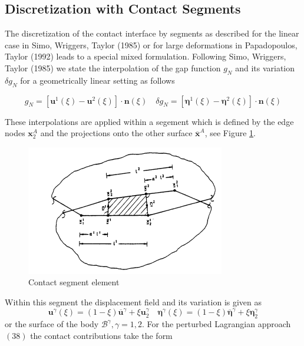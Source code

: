 \subsection{ Discretization with Contact Segments}
The discretization of the contact interface by segments as described for the linear case in Simo, Wriggers, Taylor (1985) or for large deformations in Papadopoulos, Taylor (1992) leads to a special mixed formulation. Following Simo, Wriggers, Taylor (1985) we state the interpolation of the gap function $ g_{N} $ and its variation $ \delta g_{N} $ for a geometrically linear setting as follows

\begin{equation}
\label{eqn:4.65}
g_{N}=\left[\mathbf{u}^{1}(\xi)-\mathbf{u}^{2}(\xi)\right] \cdot \mathbf{n}(\xi) \quad \delta g_{N}=\left[\boldsymbol{\eta}^{1}(\xi)-\boldsymbol{\eta}^{2}(\xi)\right] \cdot \mathbf{n}(\xi)
\end{equation}

These interpolations are applied within a segement which is defined by the edge nodes $ \mathbf{x}_{2}^{A} $ and the projections onto the other surface $ \overline{\mathbf{x}}^{{A}} $, see Figure \ref{fig4:7}.
\begin{figure}
    \centering
    \includegraphics{Figure2/Chap4/fig7.png}
    \caption{Contact segment element}
   \label{fig4:7}
\end{figure}

Within this segment the displacement field and its variation is given as
\begin{equation}
\label{eqn:4.66}
\mathbf{u}^{\gamma}(\xi)=(1-\xi) \overline{\mathbf{u}}^{\gamma}+\xi \mathbf{u}_{2}^{\gamma} \quad \boldsymbol{\eta}^{\gamma}(\xi)=(1-\xi) \overline{\boldsymbol{\eta}}^{\gamma}+\xi \boldsymbol{\eta}_{2}^{\gamma}
\end{equation}
or the surface of the body $ \mathcal{B}^{\gamma}, \gamma=1,2 $. For the perturbed Lagrangian approach $ (38) $ the contact contributions take the form

